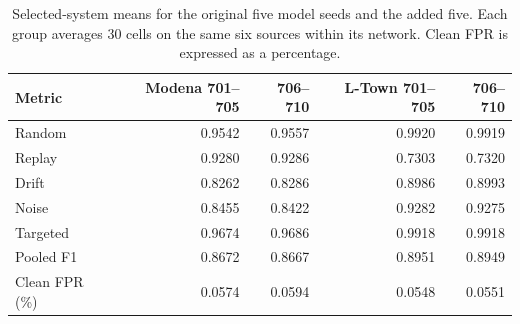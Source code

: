 \begin{table}[tbp]
\centering\small
\caption[Original and added model-seed means]{Selected-system means for the original five model seeds and the added five. Each group averages 30 cells on the same six sources within its network. Clean FPR is expressed as a percentage.}
\label{tab:extension}
\begin{tabular}{@{}lrrrr@{}}
\toprule
Metric & Modena 701--705 & 706--710 & L-Town 701--705 & 706--710\\
\midrule
Random & 0.9542 & 0.9557 & 0.9920 & 0.9919\\
Replay & 0.9280 & 0.9286 & 0.7303 & 0.7320\\
Drift & 0.8262 & 0.8286 & 0.8986 & 0.8993\\
Noise & 0.8455 & 0.8422 & 0.9282 & 0.9275\\
Targeted & 0.9674 & 0.9686 & 0.9918 & 0.9918\\
Pooled F1 & 0.8672 & 0.8667 & 0.8951 & 0.8949\\
Clean FPR (\%) & 0.0574 & 0.0594 & 0.0548 & 0.0551\\
\bottomrule
\end{tabular}
\end{table}
